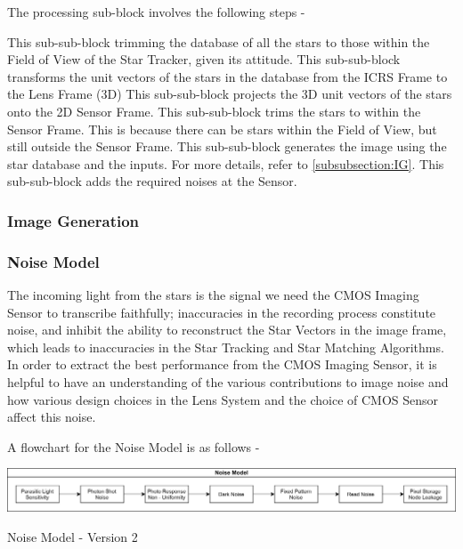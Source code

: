 The processing sub-block involves the following steps -
\begin{enumerate}[label={}]
     This sub-sub-block trimming the database of all the stars to those within the Field of View of the Star Tracker, given its attitude. 
     This sub-sub-block transforms the unit vectors of the stars in the database from the ICRS Frame to the Lens Frame (3D)
     This sub-sub-block projects the 3D unit vectors of the stars onto the 2D Sensor Frame. 
     This sub-sub-block trims the stars to within the Sensor Frame. This is because there can be stars within the Field of View, but still outside the Sensor Frame. 
     This sub-sub-block generates the image using the star database and the inputs. For more details, refer to \ref{subsubsection:IG}.
     This sub-sub-block adds the required noises at the Sensor.
\end{enumerate}


\subsubsection{Image Generation \label{subsubsection:IG}}



\subsubsection{Noise Model} %
The incoming light from the stars is the signal we need the CMOS Imaging Sensor to transcribe faithfully; inaccuracies in the recording process constitute noise, and inhibit the ability to reconstruct the Star Vectors in the image frame, which leads to inaccuracies in the Star Tracking and Star Matching Algorithms. In order to extract the best performance from the CMOS Imaging Sensor, it is helpful to have an understanding of the various contributions to image noise and how various design choices in the Lens System and the choice of CMOS Sensor affect this noise.

A flowchart for the Noise Model is as follows -

\begin{Flowchart}[h!]
    \centering
    \includegraphics[scale=0.09]{Figures/Model/Noise Model.png}
    \caption{Noise Model - Version 2}
    \label{fig:SIS_v2_NM}
\end{Flowchart}

